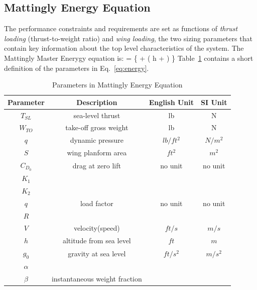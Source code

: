 \documentclass[pdftex,11pt,letter]{article}
\begin{document}
\subsection{Mattingly Energy Equation}

The performance constraints and requirements are set as functions of \emph{thrust loading} (thrust-to-weight ratio) and \emph{wing loading}, the two sizing parameters that contain key information about the top level characteristics of the system\cite{MattinglyText}. The Mattingly Master Enerygy equation is:
\beq\label{eq:energy}
 = \dfrac{\beta}{\alpha} 
\left\{ 
+
  \left( h + \right)
\right\}
\eeq
Table~\ref{tab:param_energy} contains a short definition of the parameters in Eq.~\ref{eq:energy}. 
\begin{table}[h]
\caption{Parameters in Mattingly Energy Equation}
\centering 
\begin{tabular}{c c c c}
\hline\hline
 {Parameter} & Description & English Unit & SI Unit\\
\hline\hline
$T_{SL}$ & sea-level thrust           & lb       & N     \\
$W_{TO}$ & take-off gross weight      & lb       & N     \\  
$q$     & dynamic pressure           & $lb/ft^2$& $N/m^2$\\ 
$S$     & wing planform area         & $ft^2$   & $m^2$  \\   
$C_{D_0}$& drag at zero lift          &  no unit & no unit\\
$K_1$   &                            &          &        \\
$K_2$   &                            &          &        \\
$q$     & load factor                & no unit &  no unit\\ 
$R$     &                            &          &        \\
$V$     &  velocity(speed)           &  $ft/s$  & $m/s$  \\
$h$     &  altitude from sea level   & $ft$     & $m$    \\
$g_0$   &  gravity at sea level      & $ft/s^2$ & $m/s^2$\\
$\alpha$&                            &          &        \\
$\beta$ & instantaneous weight fraction           &          &        \\
\hline
\end{tabular}
\label{tab:param_energy}
\end{table}
\end{document}
